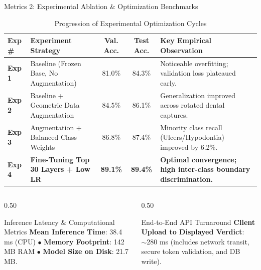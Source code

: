 \documentclass[aspectratio=169, 10pt]{beamer}
\begin{document}
\begin{frame}{Metrics 2: Experimental Ablation \& Optimization Benchmarks}
\begin{table}[H]
\centering
\small
\begin{tabular}{@{}llccp{4.2cm}@{}}
\toprule
\textbf{Exp \#} & \textbf{Experiment Strategy} & \textbf{Val. Acc.} & \textbf{Test Acc.} & \textbf{Key Empirical Observation} \\ \midrule
\textbf{Exp 1} & Baseline (Frozen Base, No Augmentation) & 81.0\% & 84.3\% & Noticeable overfitting; validation loss plateaued early. \\
\textbf{Exp 2} & Baseline + Geometric Data Augmentation & 84.5\% & 86.1\% & Generalization improved across rotated dental captures. \\
\textbf{Exp 3} & Augmentation + Balanced Class Weights & 86.8\% & 87.4\% & Minority class recall (Ulcers/Hypodontia) improved by 6.2\%. \\
\textbf{Exp 4} & \textbf{Fine-Tuning Top 30 Layers + Low LR} & \textbf{89.1\%} & \textbf{89.4\%} & \textbf{Optimal convergence; high inter-class boundary discrimination.} \\ \bottomrule
\end{tabular}
\caption{Progression of Experimental Optimization Cycles}
\end{table}
\vspace{-0.2cm}
\begin{columns}[T]
    \begin{column}{0.50\textwidth}
        \begin{block}{Inference Latency \& Computational Metrics}
            \scriptsize \textbf{Mean Inference Time}: 38.4 ms (CPU) $\bullet$ \textbf{Memory Footprint}: 142 MB RAM $\bullet$ \textbf{Model Size on Disk}: 21.7 MB.
        \end{block}
    \end{column}
    \begin{column}{0.50\textwidth}
        \begin{exampleblock}{End-to-End API Turnaround}
            \scriptsize \textbf{Client Upload to Displayed Verdict}: $\sim 280$ ms (includes network transit, secure token validation, and DB write).
        \end{exampleblock}
    \end{column}
\end{columns}
\end{frame}
\end{document}
